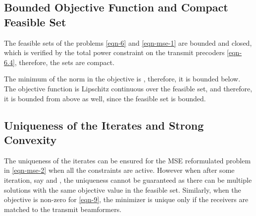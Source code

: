 \subsection{Bounded Objective Function and Compact Feasible Set}
The feasible sets of the problems \eqref{eqn-6} and \eqref{eqn-mse-1} are bounded and closed, which is verified by the total power constraint on the transmit precoders \eqref{eqn-6.4}, therefore, the sets are compact. 

The minimum of the norm in the objective is , therefore, it is bounded below. The objective function is Lipschitz continuous over the feasible set, and therefore, it is bounded from above as well, since the feasible set is bounded. %

\subsection{Uniqueness of the Iterates and Strong Convexity} \label{c-a}
The uniqueness of the iterates  can be ensured for the \ac{MSE} reformulated problem in \eqref{eqn-mse-2} when all the constraints are active. However when  after some iteration, say  and , the uniqueness cannot be guaranteed as there can be multiple solutions with the same objective value in the feasible set. Similarly, when the objective is non-zero for \eqref{eqn-9}, the minimizer is unique only if the receivers are matched to the transmit beamformers. %

